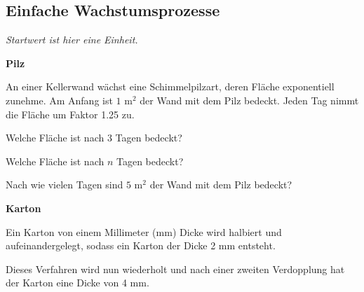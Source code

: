 \subsection{Einfache Wachstumsprozesse}
\textit{Startwert ist hier eine Einheit.}


\bbwActAufgabenNr{} \textbf{Pilz}

An einer Kellerwand wächst eine Schimmelpilzart, deren Fläche
exponentiell zunehme.
Am Anfang ist $1 \textrm{ m}^2$ der Wand mit dem Pilz bedeckt. Jeden Tag nimmt die Fläche um Faktor 1.25 zu.

\begin{bbwAufgabenBlock}
\item Welche Fläche ist nach 3 Tagen bedeckt?
\item Welche Fläche ist nach $n$ Tagen bedeckt?
\item Nach wie vielen Tagen sind $5 \textrm{ m}^2$ der Wand mit dem Pilz bedeckt?
\end{bbwAufgabenBlock}
\platzFuerBerechnungenBisEndeSeite{}


\bbwActAufgabenNr{} \textbf{Karton}

Ein Karton von einem Millimeter (mm) Dicke wird halbiert
und aufeinandergelegt, sodass ein Karton der Dicke 2 mm entsteht.

Dieses Verfahren wird nun wiederholt und nach einer zweiten
Verdopplung hat der Karton eine Dicke von 4 mm.

